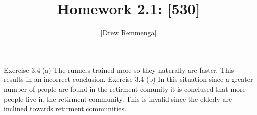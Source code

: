 \documentclass[10pt, oneside]{article}
\title{Homework 2.1: [530]}
\author{[Drew Remmenga]}
\begin{document}
\maketitle
\pagebreak
Exercise 3.4 (a)
The runners trained more so they naturally are faster. This results in an incorrect conclusion. 
\clearpage
Exercise 3.4 (b)
In this situation since a greater number of people are found in the retirment comunity it is conclused that more people live in the retirment community. This is invalid since the elderly are inclined towards retirment communities. 
\end{document}
